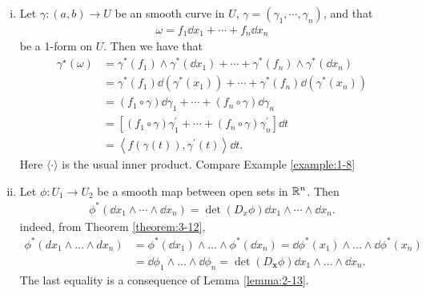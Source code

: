 \begin{example}\;\par\label{example:3-13}
\begin{enumerate}[(i)]
  \item Let $\gamma:(a, b)\to U$ be an smooth curve in $U$, $\gamma = (\gamma_1, \cdots, \gamma_n)$, and that 
    \begin{align*}
      \omega = f_1\dd x_1 + \cdots + f_n\dd x_n
    \end{align*}
    be a 1-form on $U$. Then we have that 
    \begin{align*}
      \gamma^{\star}(\omega)
      & = \gamma^{*}(f_{1})\wedge\gamma^{*}(\dd x_{1})+\cdots+\gamma^{*}(f_{n})\wedge\gamma^{*}(\dd x_{n})\\
      & = \gamma^{*}(f_{1})\dd(\gamma^{*}(x_{1}))+\cdots+\gamma^{*}(f_{n})\dd(\gamma^{*}(x_{n}))\\
      & = (f_{1}\circ\gamma)\dd\gamma_{1}+\cdots+(f_{n}\circ\gamma)\dd\gamma_{n}\\
      & = \left[(f_{1}\circ\gamma)\gamma_{1}^{\prime}+\cdots+(f_{n}\circ\gamma)\gamma_{n}^{\prime}\right]\dd t\\
      & = \left\langle f(\gamma(t)),\gamma^{\prime}(t)\right\rangle \dd t.
    \end{align*}
    Here $\langle\cdot\rangle$ is the usual inner product. Compare Example \ref{example:1-8}
  \item Let $\phi:U_1\to U_2$ be a smooth map between open sets in $\mathbb{R}^n$. Then
    \begin{align*}
      \phi^*(\dd x_1\wedge\cdots\wedge\dd x_n) = \det (D_x\phi)\dd x_1\wedge\cdots\wedge\dd x_n.
    \end{align*}
    indeed, from Theorem \ref{theorem:3-12},
    \begin{align*}
      \phi^{*}(dx_{1}\wedge\ldots\wedge dx_{n})
      & = \phi^*(\dd x_1)\wedge\ldots\wedge\phi^*(\dd x_n)
          = \dd\phi^*(x_1)\wedge\ldots\wedge \dd\phi^*(x_n)\\
      & = \dd\phi_1\wedge\ldots\wedge \dd\phi_n
          = \det{(D_{\boldsymbol{x}}\phi)}\dd x_1\wedge\ldots\wedge \dd x_n.
    \end{align*}
    The last equality is a consequence of Lemma \ref{lemma:2-13}.
\end{enumerate}
\end{example}

